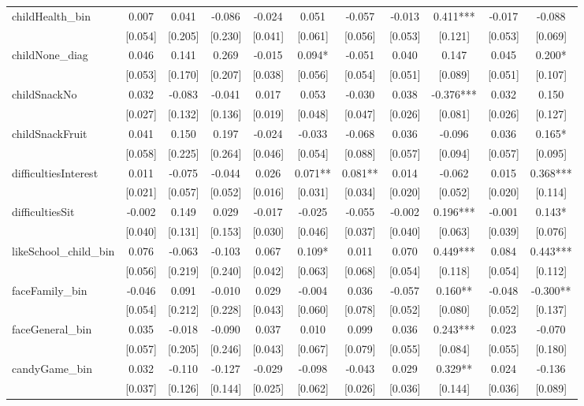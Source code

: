 \documentclass[12pt]{article}
\begin{document}
\begin{table}[ht]
\begin{center}
\begin{adjustbox}{width=1.2\textwidth,center=\textwidth}
\begin{tabular}{l*{10}{c}}
childHealth\_bin & 0.007 & 0.041 & -0.086 & -0.024 & 0.051 & -0.057 & -0.013 & 0.411*** & -0.017 & -0.088 \\
 & [0.054] & [0.205] & [0.230] & [0.041] & [0.061] & [0.056] & [0.053] & [0.121] & [0.053] & [0.069] \\
childNone\_diag & 0.046 & 0.141 & 0.269 & -0.015 & 0.094* & -0.051 & 0.040 & 0.147 & 0.045 & 0.200* \\
 & [0.053] & [0.170] & [0.207] & [0.038] & [0.056] & [0.054] & [0.051] & [0.089] & [0.051] & [0.107] \\
childSnackNo & 0.032 & -0.083 & -0.041 & 0.017 & 0.053 & -0.030 & 0.038 & -0.376*** & 0.032 & 0.150 \\
 & [0.027] & [0.132] & [0.136] & [0.019] & [0.048] & [0.047] & [0.026] & [0.081] & [0.026] & [0.127] \\
childSnackFruit & 0.041 & 0.150 & 0.197 & -0.024 & -0.033 & -0.068 & 0.036 & -0.096 & 0.036 & 0.165* \\
 & [0.058] & [0.225] & [0.264] & [0.046] & [0.054] & [0.088] & [0.057] & [0.094] & [0.057] & [0.095] \\
difficultiesInterest & 0.011 & -0.075 & -0.044 & 0.026 & 0.071** & 0.081** & 0.014 & -0.062 & 0.015 & 0.368*** \\
 & [0.021] & [0.057] & [0.052] & [0.016] & [0.031] & [0.034] & [0.020] & [0.052] & [0.020] & [0.114] \\
difficultiesSit & -0.002 & 0.149 & 0.029 & -0.017 & -0.025 & -0.055 & -0.002 & 0.196*** & -0.001 & 0.143* \\
 & [0.040] & [0.131] & [0.153] & [0.030] & [0.046] & [0.037] & [0.040] & [0.063] & [0.039] & [0.076] \\
likeSchool\_child\_bin & 0.076 & -0.063 & -0.103 & 0.067 & 0.109* & 0.011 & 0.070 & 0.449*** & 0.084 & 0.443*** \\
 & [0.056] & [0.219] & [0.240] & [0.042] & [0.063] & [0.068] & [0.054] & [0.118] & [0.054] & [0.112] \\
faceFamily\_bin & -0.046 & 0.091 & -0.010 & 0.029 & -0.004 & 0.036 & -0.057 & 0.160** & -0.048 & -0.300** \\
 & [0.054] & [0.212] & [0.228] & [0.043] & [0.060] & [0.078] & [0.052] & [0.080] & [0.052] & [0.137] \\
faceGeneral\_bin & 0.035 & -0.018 & -0.090 & 0.037 & 0.010 & 0.099 & 0.036 & 0.243*** & 0.023 & -0.070 \\
 & [0.057] & [0.205] & [0.246] & [0.043] & [0.067] & [0.079] & [0.055] & [0.084] & [0.055] & [0.180] \\
candyGame\_bin & 0.032 & -0.110 & -0.127 & -0.029 & -0.098 & -0.043 & 0.029 & 0.329** & 0.024 & -0.136 \\
 & [0.037] & [0.126] & [0.144] & [0.025] & [0.062] & [0.026] & [0.036] & [0.144] & [0.036] & [0.089] \\


\end{tabular}
\end{adjustbox}
\end{center}
\end{table}
\end{document}
